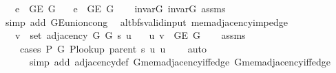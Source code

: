 \begin{isabellebody}
\ \ \ {\isachardoublequoteopen}e\ {\isasymin}\ G{\isachardot}{\kern0pt}E\ G{}{\isachardoublequoteclose}\isanewline
\ \ \ {\isachardoublequoteopen}e\ {\isasymin}\ G{\isachardot}{\kern0pt}E\ G{\isachardoublequoteclose}%
\endisataginvisible
{\isafoldinvisible}%
%
\isadeliminvisible
\isanewline
%
\endisadeliminvisible
%
\isadelimproof
\ \ %
\endisadelimproof
%
\isatagproof
{}\isamarkupfalse%
\ invar{\isacharunderscore}{\kern0pt}G{}\ invar{\isacharunderscore}{\kern0pt}G{}\ assms\isanewline
\ \ \isamarkupfalse%
\ {\isacharparenleft}{\kern0pt}simp\ add{\isacharcolon}{\kern0pt}\ G{\isachardot}{\kern0pt}E{\isacharunderscore}{\kern0pt}union{\isacharunderscore}{\kern0pt}cong{\isacharparenright}{\kern0pt}%
\endisatagproof
{\isafoldproof}%
%
\isadelimproof
\isanewline
%
\endisadelimproof
%
\isadeliminvisible
\isanewline
%
\endisadeliminvisible
%
\isataginvisible
{}\isamarkupfalse%
\ {\isacharparenleft}{\kern0pt}\ alt{\isacharunderscore}{\kern0pt}bfs{\isacharunderscore}{\kern0pt}valid{\isacharunderscore}{\kern0pt}input{\isacharparenright}{\kern0pt}\ mem{\isacharunderscore}{\kern0pt}adjacency{\isacharunderscore}{\kern0pt}imp{\isacharunderscore}{\kern0pt}edge{\isacharcolon}{\kern0pt}\isanewline
\ \ \ {\isachardoublequoteopen}v\ {\isasymin}\ set\ {\isacharparenleft}{\kern0pt}adjacency\ G{}\ G{}\ s\ u{\isacharparenright}{\kern0pt}{\isachardoublequoteclose}\isanewline
\ \ \ {\isachardoublequoteopen}{\isacharbraceleft}{\kern0pt}u{\isacharcomma}{\kern0pt}\ v{\isacharbraceright}{\kern0pt}\ {\isasymin}\ G{\isachardot}{\kern0pt}E\ G{\isachardoublequoteclose}%
\endisataginvisible
{\isafoldinvisible}%
%
\isadeliminvisible
\isanewline
%
\endisadeliminvisible
%
\isadelimproof
\ \ %
\endisadelimproof
%
\isatagproof
{}\isamarkupfalse%
\ assms\isanewline
\ \ \isamarkupfalse%
\isanewline
\ \ \ \ {\isacharparenleft}{\kern0pt}cases\ {\isachardoublequoteopen}P{\isacharprime}{\kern0pt}\ G{}\ {\isacharparenleft}{\kern0pt}P{\isacharunderscore}{\kern0pt}lookup\ {\isacharparenleft}{\kern0pt}parent\ s{\isacharparenright}{\kern0pt}\ u{\isacharparenright}{\kern0pt}\ u{\isachardoublequoteclose}{\isacharparenright}{\kern0pt}\isanewline
\ \ \ \ {\isacharparenleft}{\kern0pt}auto\isanewline
\ \ \ \ \ \ simp\ add{\isacharcolon}{\kern0pt}\ adjacency{\isacharunderscore}{\kern0pt}def\ G{}{\isachardot}{\kern0pt}mem{\isacharunderscore}{\kern0pt}adjacency{\isacharunderscore}{\kern0pt}iff{\isacharunderscore}{\kern0pt}edge\ G{}{\isachardot}{\kern0pt}mem{\isacharunderscore}{\kern0pt}adjacency{\isacharunderscore}{\kern0pt}iff{\isacharunderscore}{\kern0pt}edge\isanewline

\end{isabellebody}
